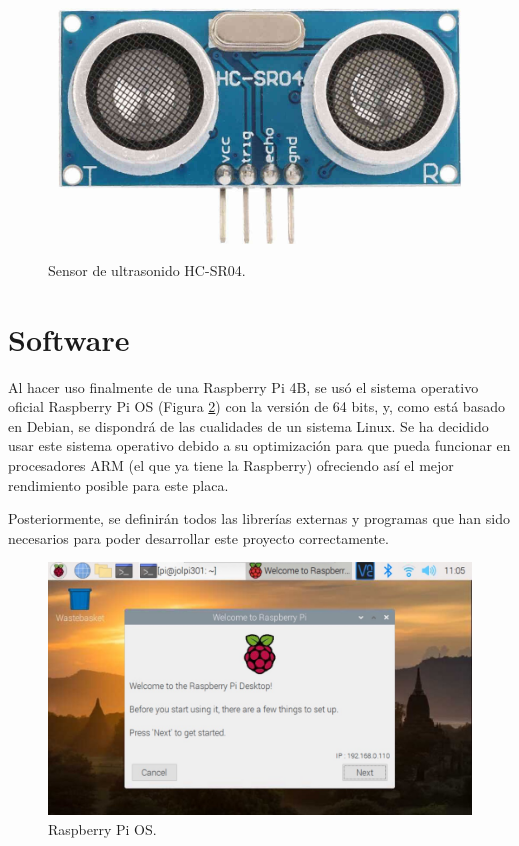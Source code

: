 \begin{figure}[H]
  \centering
  \includegraphics[scale=0.6]{figs/hcsr04} %
  \caption{Sensor de ultrasonido HC-SR04.}
  \label{fig:hcsr04}
\end{figure}

\section{Software}
\label{sec:software}


Al hacer uso finalmente de una Raspberry Pi 4B, se usó el sistema operativo oficial Raspberry Pi OS (Figura \ref{fig:raspbian}) con la versión de 64 bits, y, como está basado en Debian, se dispondrá de las cualidades de un sistema Linux. Se ha decidido usar este sistema operativo debido a su optimización para que pueda funcionar en procesadores ARM (el que ya tiene la Raspberry) ofreciendo así el mejor rendimiento posible para este placa.


Posteriormente, se definirán todos las librerías externas y programas que han sido necesarios para poder desarrollar este proyecto correctamente.

\begin{figure}[H]
  \centering
  \includegraphics[scale=0.3]{figs/raspbian} %
  \caption{Raspberry Pi OS.}
  \label{fig:raspbian}
\end{figure}


